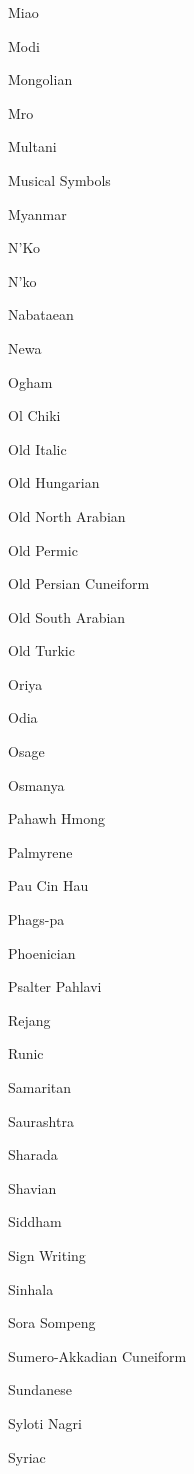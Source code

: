 \documentclass[a4paper]{l3doc}
\begin{document}
\begin{table}[!hbp]
\begin{multicols}{4}
    Miao \par
    Modi \par
    Mongolian \par
    Mro \par
    Multani \par
    Musical Symbols \par
    Myanmar \par
    \dup N'Ko \par
    \dup N'ko \par
    Nabataean \par
    Newa \par
    Ogham \par
    Ol Chiki \par
    Old Italic \par
    Old Hungarian \par
    Old North Arabian \par
    Old Permic \par
    Old Persian Cuneiform \par
    Old South Arabian \par
    Old Turkic \par
    \dup Oriya \par
    \dup Odia \par
    Osage \par
    Osmanya \par
    Pahawh Hmong \par
    Palmyrene \par
    Pau Cin Hau \par
    Phags-pa \par
    Phoenician \par
    Psalter Pahlavi \par
    Rejang \par
    Runic \par
    Samaritan \par
    Saurashtra \par
    Sharada \par
    Shavian \par
    Siddham \par
    Sign Writing \par
    Sinhala \par
    Sora Sompeng \par
    Sumero-Akkadian Cuneiform \par
    Sundanese \par
    Syloti Nagri \par
    Syriac \par

\end{multicols}
\end{table}
\end{document}
